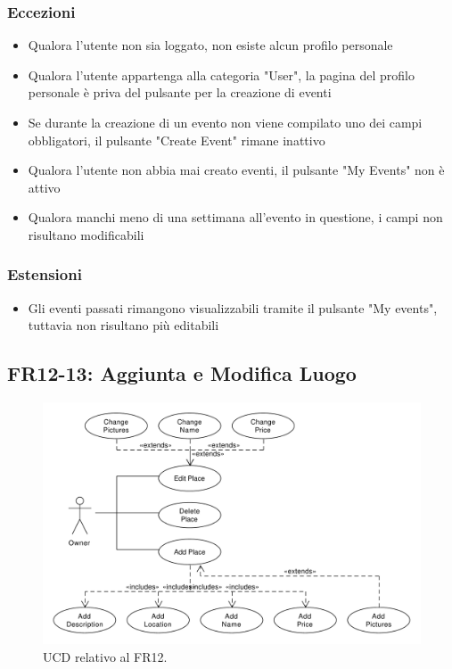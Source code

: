 \documentclass[9pt]{extarticle}
\begin{document}
\subsubsection*{Eccezioni}\label{Eccezioni-FR8-10}

\begin{itemize}
	\item Qualora l'utente non sia loggato, non esiste alcun profilo personale
	\item Qualora l'utente appartenga alla categoria "User", la pagina del profilo personale è priva del pulsante per la creazione di eventi
	\item Se durante la creazione di un evento non viene compilato uno dei campi obbligatori, il pulsante "Create Event" rimane inattivo
	\item Qualora l'utente non abbia mai creato eventi, il pulsante "My Events" non è attivo
	\item Qualora manchi meno di una settimana all'evento in questione, i campi non risultano modificabili
\end{itemize}

\subsubsection*{Estensioni}\label{Estensioni-FR8-10}

\begin{itemize}
	\item Gli eventi passati rimangono visualizzabili tramite il pulsante "My events", tuttavia non risultano più editabili
\end{itemize}


\subsection{FR12-13: Aggiunta e Modifica Luogo}


\begin{figure}[!htb]
	\centering
	\includegraphics[width=\linewidth]{./images/FR12.pdf}
	\caption{UCD relativo al FR12.}
	\label{fig:UCD_FR12}
\end{figure}
\end{document}
